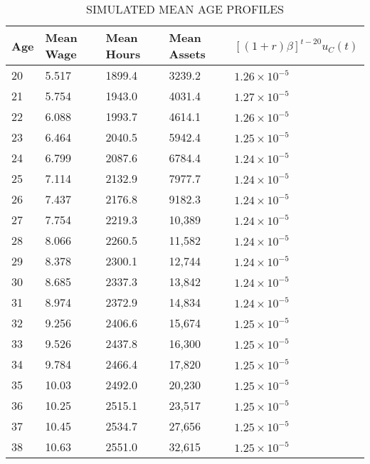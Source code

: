 
%

\begin{center}
  \hypertarget{SimulatedProfiles}{}
  \begin{table}
  \centering
    \caption{ \label{tab:SimulatedProfiles}\\
      \scriptsize SIMULATED MEAN AGE PROFILES}
  \begin{tabular}{lllll}
    \hline%
    Age  & Mean Wage & Mean Hours & Mean Assets & $[(1+r) \beta]^{t-20} u_C(t)$ \\ \hline
20 & 5.517 & 1899.4 & 3239.2 & $1.26 \times 10^{-5}$ \\
21 & 5.754 & 1943.0 & 4031.4 & $1.27 \times 10^{-5}$ \\
22 & 6.088 & 1993.7 & 4614.1 & $1.26 \times 10^{-5} $\\
23 & 6.464 & 2040.5 & 5942.4 & $1.25 \times 10^{-5} $\\
24 & 6.799 & 2087.6 & 6784.4 & $1.24 \times 10^{-5} $\\
25 & 7.114 & 2132.9 & 7977.7 & $1.24 \times 10^{-5}$ \\
26 & 7.437 & 2176.8 & 9182.3 &$ 1.24 \times 10^{-5} $\\
27 & 7.754 & 2219.3 & 10,389 &$ 1.24 \times 10^{-5}$ \\
28 & 8.066 & 2260.5 & 11,582 & $1.24 \times 10^{-5}$ \\
29 & 8.378 & 2300.1 & 12,744 & $1.24 \times 10^{-5}$ \\
30 & 8.685 & 2337.3 & 13,842 &$ 1.24 \times 10^{-5} $\\
31 & 8.974 & 2372.9 & 14,834 & $1.24 \times 10^{-5}$ \\
32 & 9.256 & 2406.6 & 15,674 & $1.25 \times 10^{-5} $\\
33 & 9.526 & 2437.8 & 16,300 & $1.25 \times 10^{-5} $\\
34 & 9.784 & 2466.4 & 17,820 & $1.25 \times 10^{-5} $\\
35 & 10.03 & 2492.0 & 20,230 & $1.25 \times 10^{-5}$ \\
36 & 10.25 & 2515.1 & 23,517 & $1.25 \times 10^{-5} $\\
37 & 10.45 & 2534.7 & 27,656 & $1.25 \times 10^{-5} $\\
38 & 10.63 & 2551.0 & 32,615 & $1.25 \times 10^{-5} $\\

\end{tabular}
\end{table}
\end{center}
